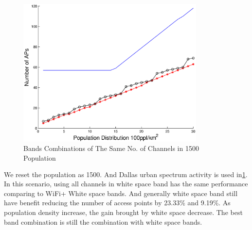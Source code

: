    \begin{figure}
   \centering
   \includegraphics[width=94mm]{figures/varybandcomb2}
   \vspace{-0.1in}
   \caption{Bands Combinations of The Same No. of Channels in 1500 Population} 
   \label{fig:varybandcomb2}
   \end{figure}

We reset the population as 1500. And Dallas urban spectrum activity is used in\ref{fig:varybandcomb2}.
In this scenario, using all channels in white space band has the same performance comparing to WiFi+
White space bands. And generally white space band still have benefit reducing the number of access points
by 23.33\% and 9.19\%. As population density increase, the gain brought by white space decrease. The best
band combination is still the combination with white space bands. 

